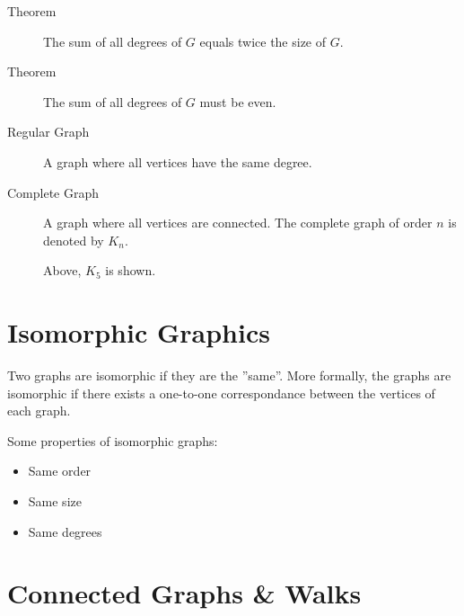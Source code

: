 \begin{description}
    \item[Theorem] The sum of all degrees of $G$ equals
    twice the size of $G$.

    \item[Theorem] The sum of all degrees of $G$ must be
    even.

    \item[Regular Graph] A graph where all vertices have
    the same degree.

    \item[Complete Graph] A graph where all vertices are
    connected. The complete graph of order $n$ is denoted
    by $K_n$.
    
    \begin{center}

        Above, $K_5$ is shown.
    \end{center}
\end{description}

\section{Isomorphic Graphics}

Two graphs are isomorphic if they are the ''same''. More
formally, the graphs are isomorphic if there exists a
one-to-one correspondance between the vertices of each
graph.

Some properties of isomorphic graphs:
\begin{itemize}
    \item Same order
    \item Same size
    \item Same degrees
\end{itemize}

\section{Connected Graphs \& Walks}

